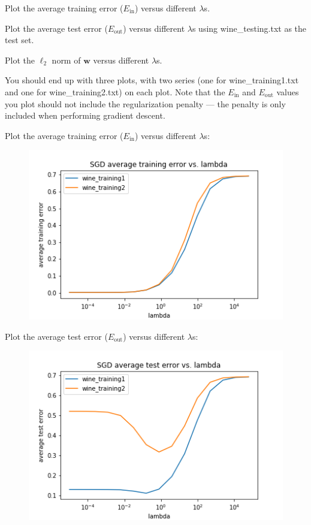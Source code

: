\subproblem Plot the average training error ($E_\text{in}$) versus different $\lambda$s.

\subproblem Plot the average test error ($E_\text{out}$) versus different $\lambda$s using wine\_testing.txt as the test set.

\subproblem Plot the $\ell_2$ norm of $\mathbf{w}$ versus different $\lambda$s. \medskip

 You should end up with three plots, with two series (one for wine\_training1.txt and one for wine\_training2.txt) on each plot. Note that the $E_\text{in}$ and $E_\text{out}$ values you plot should not include the regularization penalty --- the penalty is only included when performing gradient descent.

Plot the average training error ($E_\text{in}$) versus different $\lambda$s:
\noindent
\begin{figure}[H]
\centering
\includegraphics[scale=0.6]{2c_plot_train_errors.png}
\end{figure}
\noindent
Plot the average test error ($E_\text{out}$) versus different $\lambda$s:
\noindent
\begin{figure}[H]
\centering
\includegraphics[scale=0.6]{2c_plot_test_errors.png}
\end{figure}
